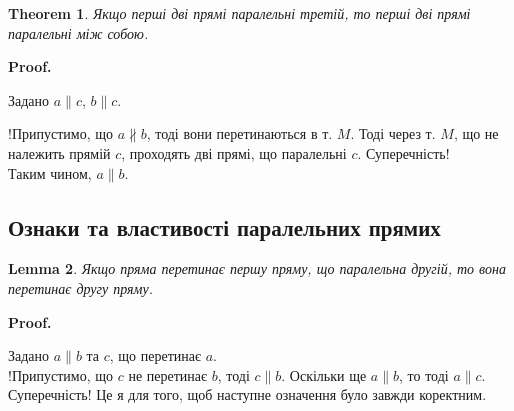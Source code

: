 \documentclass[a4paper, 10pt]{article}
\makeatletter
\def\qed{$\blacksquare$}
\theoremstyle{theoremdd}
\newtheorem{theorem}{Theorem}[subsection]
\theoremstyle{theoremdd}
\theoremstyle{theoremdd}
\theoremstyle{theoremdd}
\theoremstyle{theoremdd}
\theoremstyle{theoremdd}
\theoremstyle{theoremdd}
\theoremstyle{theoremdd}
\newtheorem{lemma}[theorem]{Lemma}
\theoremstyle{theoremdd}
\renewenvironment{proof}[1][Proof.\\]{\par
\pushQED{\hfill \qed}%
\normalfont \topsep6\p@\@plus6\p@\relax
\trivlist
\item\relax
{\bfseries
#1\@addpunct{.}}\hspace\labelsep\ignorespaces
}{%
\popQED\endtrivlist\@endpefalse
}
\makeatother
\begin{document}
\begin{theorem}
Якщо перші дві прямі паралельні третій, то перші дві прямі паралельні між собою.
\end{theorem}

\begin{proof}
Задано $a \parallel c$, $b \parallel c$.\\
\begin{figure}[H]
\centering
{}
\end{figure}
!Припустимо, що $a \not\parallel b$, тоді вони перетинаються в т. $M$. Тоді через т. $M$, що не належить прямій $c$, проходять дві прямі, що паралельні $c$. Суперечність!\\
Таким чином, $a \parallel b$.
\end{proof}

\subsection{Ознаки та властивості паралельних прямих}
\begin{lemma}
Якщо пряма перетинає першу пряму, що паралельна другій, то вона перетинає другу пряму.
\end{lemma}

\begin{proof}
Задано $a \parallel b$ та $c$, що перетинає $a$.\\
!Припустимо, що $c$ не перетинає $b$, тоді $c \parallel b$. Оскільки ще $a \parallel b$, то тоді $a \parallel c$. Суперечність!
\end{proof}
Це я для того, щоб наступне означення було завжди коректним.
\end{document}

